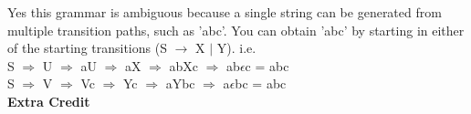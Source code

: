 \documentclass[12pt]{report}
\begin{document}
Yes this grammar is ambiguous because a single string can be generated from multiple transition paths, such as 'abc'.  You can obtain 'abc' by starting in either of the starting transitions (S $\rightarrow$ X $\vert$ Y). i.e. \\
\tab S $\Rightarrow$ U $\Rightarrow$ aU $\Rightarrow$ aX $\Rightarrow$  abXc $\Rightarrow$ ab$\epsilon$c = abc \\
\tab S $\Rightarrow$ V $\Rightarrow$ Vc $\Rightarrow$ Yc $\Rightarrow$ aYbc $\Rightarrow$ a$\epsilon$bc = abc \\


\pagebreak
\textbf{ Extra Credit}\newline

\begin{comment}
\begin{center}
	\begin{tikzpicture}[scale=0.2]
		\tikzstyle{every node}+=[inner sep=0pt]
		\draw [black] (6.1,-17.2) circle (3);
		\draw (6.1,-17.2) node {$q_0$};
		\draw [black] (21.7,-17.3) circle (3);
		\draw (21.7,-17.3) node {$q_1$};
		\draw [black] (37.5,-17.3) circle (3);
		\draw (37.5,-17.3) node {$q_2$};
		\draw [black] (55.1,-17.3) circle (3);
		\draw (55.1,-17.3) node {$q_3$};
		\draw [black] (71.9,-17.3) circle (3);
		\draw (71.9,-17.3) node {$q_4$};
		\draw [black] (9.1,-17.22) -- (18.7,-17.28);
		\fill [black] (18.7,-17.28) -- (17.9,-16.78) -- (17.9,-17.78);
		\draw (13.89,-17.8) node [below] {$\epsilon,\mbox{ }\epsilon\mbox{ }\rightarrow\mbox{ }\$$};
		\draw [black] (24.7,-17.3) -- (34.5,-17.3);
		\fill [black] (34.5,-17.3) -- (33.7,-16.8) -- (33.7,-17.8);
		\draw (29.6,-17.8) node [below] {$\#,\mbox{ }\epsilon\mbox{ }\rightarrow\mbox{ }\epsilon$};
		\draw [black] (40.5,-17.3) -- (52.1,-17.3);
		\fill [black] (52.1,-17.3) -- (51.3,-16.8) -- (51.3,-17.8);
		\draw (46.3,-17.8) node [below] {\begin{tabular}{c}$1, 0 \rightarrow \epsilon$\\ $0, 1 \rightarrow \epsilon $\end{tabular}};
		\draw [black] (58.1,-17.3) -- (68.9,-17.3);
		\fill [black] (68.9,-17.3) -- (68.1,-16.8) -- (68.1,-17.8);
		\draw (63.5,-17.8) node [below] {$\epsilon,\mbox{ }\$\mbox{ }\rightarrow\mbox{ }\epsilon$};
		\draw [black] (20.377,-14.62) arc (234:-54:2.25);
		\draw (21.7,-10.05) node [above] {\begin{tabular}{c}$ 0, \epsilon \rightarrow 0$ \\ $1, \epsilon \rightarrow 1$\end{tabular}};

\end{comment}
\end{document}
